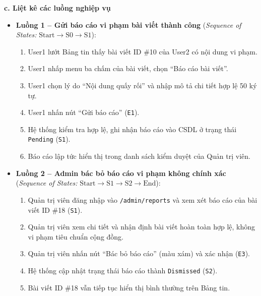 \documentclass[11pt,a4paper]{article}
\begin{document}
\noindent\textbf{c. Liệt kê các luồng nghiệp vụ}
\begin{itemize}[leftmargin=1.2cm, noitemsep]
    \item[\textbf{--}] \textbf{Luồng 1 -- Gửi báo cáo vi phạm bài viết thành công} (\textit{Sequence of States:} $\text{Start} \rightarrow \text{S0} \rightarrow \text{S1}$):
    \begin{enumerate}[leftmargin=0.7cm, noitemsep]
        \item User1 lướt Bảng tin thấy bài viết ID \#10 của User2 có nội dung vi phạm.
        \item User1 nhấp menu ba chấm của bài viết, chọn ``Báo cáo bài viết''.
        \item User1 chọn lý do ``Nội dung quấy rối'' và nhập mô tả chi tiết hợp lệ 50 ký tự.
        \item User1 nhấn nút ``Gửi báo cáo'' (\texttt{E1}).
        \item Hệ thống kiểm tra hợp lệ, ghi nhận báo cáo vào CSDL ở trạng thái \texttt{Pending} (\texttt{S1}).
        \item Báo cáo lập tức hiển thị trong danh sách kiểm duyệt của Quản trị viên.
    \end{enumerate}

    \item[\textbf{--}] \textbf{Luồng 2 -- Admin bác bỏ báo cáo vi phạm không chính xác} (\textit{Sequence of States:} $\text{Start} \rightarrow \text{S1} \rightarrow \text{S2} \rightarrow \text{End}$):
    \begin{enumerate}[leftmargin=0.7cm, noitemsep]
        \item Quản trị viên đăng nhập vào \texttt{/admin/reports} và xem xét báo cáo của bài viết ID \#18 (\texttt{S1}).
        \item Quản trị viên xem chi tiết và nhận định bài viết hoàn toàn hợp lệ, không vi phạm tiêu chuẩn cộng đồng.
        \item Quản trị viên nhấn nút ``Bác bỏ báo cáo'' (màu xám) và xác nhận (\texttt{E3}).
        \item Hệ thống cập nhật trạng thái báo cáo thành \texttt{Dismissed} (\texttt{S2}).
        \item Bài viết ID \#18 vẫn tiếp tục hiển thị bình thường trên Bảng tin.
    \end{enumerate}


\end{itemize}
\end{document}
